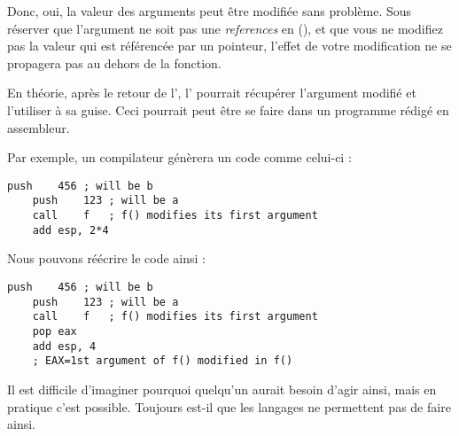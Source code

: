 


Donc, oui, la valeur des arguments peut être modifiée sans problème.
Sous réserver que l'argument ne soit pas une \emph{references} en \Cpp{} (),
et que vous ne modifiez pas la valeur qui est référencée par un pointeur, l'effet de votre modification
ne se propagera pas au dehors de la fonction.

En théorie, après le retour de l', l' pourrait récupérer l'argument modifié et
l'utiliser à sa guise.
Ceci pourrait peut être se faire dans un programme rédigé en assembleur.

Par exemple, un compilateur \CCpp génèrera un code comme celui-ci :

\begin{lstlisting}[style=customasmx86]
	push	456	; will be b
	push	123	; will be a
	call	f	; f() modifies its first argument
	add	esp, 2*4
\end{lstlisting}

Nous pouvons réécrire le code ainsi :

\begin{lstlisting}[style=customasmx86]
	push	456	; will be b
	push	123	; will be a
	call	f	; f() modifies its first argument
	pop	eax
	add	esp, 4
	; EAX=1st argument of f() modified in f()
\end{lstlisting}

Il est difficile d'imaginer pourquoi quelqu'un aurait besoin d'agir ainsi, mais en pratique
c'est possible.
Toujours est-il que les langages \CCpp ne permettent pas de faire ainsi.





